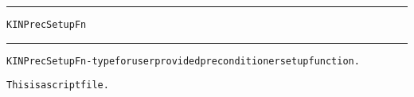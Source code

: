 \begin{samepage}
\hrule
\begin{center}
{\large \verb!KINPrecSetupFn!}
\label{p:KINPrecSetupFn}
\end{center}
\hrule\vspace{0.1in}



\begin{alltt}
KINPrecSetupFn - type for user provided preconditioner setup function.
\end{alltt}

\end{samepage}



\begin{samepage}


\begin{alltt}
This is a script file. 
\end{alltt}

\end{samepage}



